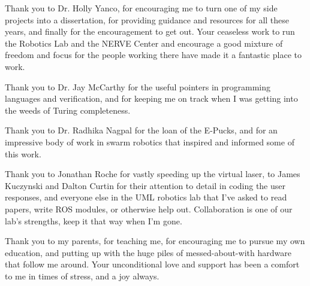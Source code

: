 Thank you to Dr. Holly Yanco, for encouraging me to turn one of my side projects into a dissertation, for providing guidance and resources for all these years, and finally for the encouragement to get out. Your ceaseless work to run the Robotics Lab and the NERVE Center and encourage a good mixture of freedom and focus for the people working there have made it a fantastic place to work. 

Thank you to Dr. Jay McCarthy for the useful pointers in programming languages and verification, and for keeping me on track when I was getting into the weeds of Turing completeness. 

Thank you to Dr. Radhika Nagpal for the loan of the E-Pucks, and for an impressive body of work in swarm robotics that inspired and informed some of this work. 

Thank you to Jonathan Roche for vastly speeding up the virtual laser, to James Kuczynski and Dalton Curtin for their attention to detail in coding the user responses, and everyone else in the UML robotics lab that I've asked to read papers, write ROS modules, or otherwise help out. Collaboration is one of our lab's strengths, keep it that way when I'm gone.  

Thank you to my parents, for teaching me, for encouraging me to pursue my own education, and putting up with the huge piles of messed-about-with hardware that follow me around. Your unconditional love and support has been a comfort to me in times of stress, and a joy always.

